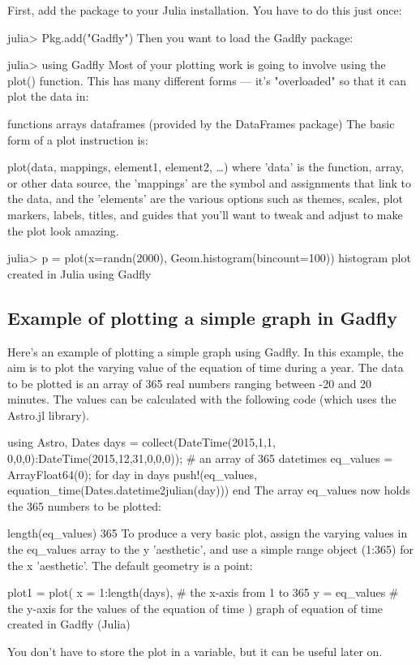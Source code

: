 First, add the package to your Julia installation. You have to do this just once:

julia> Pkg.add("Gadfly")
Then you want to load the Gadfly package:

julia> using Gadfly
Most of your plotting work is going to involve using the plot() function. This has many different forms — it's "overloaded" so that it can plot the data in:

functions
arrays
dataframes (provided by the DataFrames package)
The basic form of a plot instruction is:

plot(data, mappings, element1, element2, …)
where 'data' is the function, array, or other data source, the 'mappings' are the symbol and assignments that link to the data, and the 'elements' are the various options such as themes, scales, plot markers, labels, titles, and guides that you'll want to tweak and adjust to make the plot look amazing.

julia> p = plot(x=randn(2000), Geom.histogram(bincount=100))
histogram plot created in Julia using Gadfly

\subsection*{Example of plotting a simple graph in Gadfly}
Here's an example of plotting a simple graph using Gadfly. In this example, the aim is to plot the varying value of the equation of time during a year. The data to be plotted is an array of 365 real numbers ranging between -20 and 20 minutes. The values can be calculated with the following code (which uses the Astro.jl library).

using Astro, Dates 
days = collect(DateTime(2015,1,1, 0,0,0):DateTime(2015,12,31,0,0,0)); # an array of 365 datetimes
eq_values = Array{Float64}(0);
for day in days
   push!(eq_values, equation_time(Dates.datetime2julian(day)))
end
The array eq_values now holds the 365 numbers to be plotted:

length(eq_values)
365
To produce a very basic plot, assign the varying values in the eq_values array to the y 'aesthetic', and use a simple range object (1:365) for the x 'aesthetic'. The default geometry is a point:

plot1 = plot(
   x = 1:length(days), # the x-axis from 1 to 365
   y = eq_values       # the y-axis for the values of the equation of time   
   )
graph of equation of time created in Gadfly (Julia)

You don't have to store the plot in a variable, but it can be useful later on.


